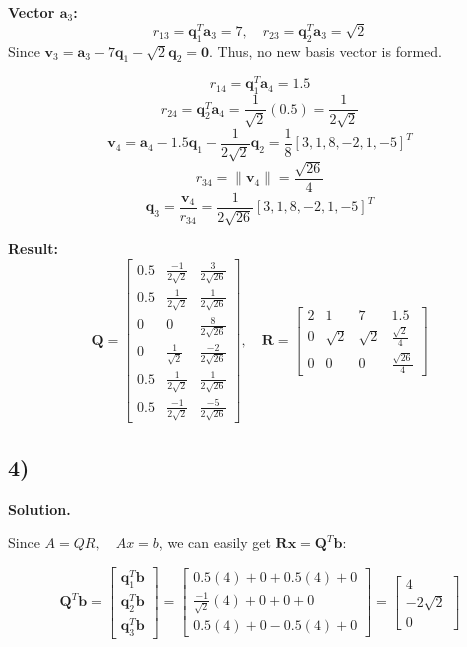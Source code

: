 \documentclass{article}
\newcommand{\0}{{\mathbf{0}}} %
\begin{document}
\textbf{Vector $\mathbf{a}_3$:}
\[ r_{13} = \mathbf{q}_1^T \mathbf{a}_3 = 7, \quad r_{23} = \mathbf{q}_2^T \mathbf{a}_3 = \sqrt{2} \]
Since $\mathbf{v}_3 = \mathbf{a}_3 - 7\mathbf{q}_1 - \sqrt{2}\mathbf{q}_2 = \mathbf{0}$. Thus, no new basis vector is formed.

\[ r_{14} = \mathbf{q}_1^T \mathbf{a}_4 = 1.5 \]
\[ r_{24} = \mathbf{q}_2^T \mathbf{a}_4 = \frac{1}{\sqrt{2}}(0.5) = \frac{1}{2\sqrt{2}} \]
\[ \mathbf{v}_4 = \mathbf{a}_4 - 1.5\mathbf{q}_1 - \frac{1}{2\sqrt{2}}\mathbf{q}_2 = \frac{1}{8}[3, 1, 8, -2, 1, -5]^T \]
\[ r_{34} = \|\mathbf{v}_4\| = \frac{\sqrt{26}}{4} \]
\[ \mathbf{q}_3 = \frac{\mathbf{v}_4}{r_{34}} = \frac{1}{2\sqrt{26}}[3, 1, 8, -2, 1, -5]^T \]

\textbf{Result:}
\[
\mathbf{Q} =
\begin{bmatrix} 0.5 & \frac{-1}{2\sqrt{2}} & \frac{3}{2\sqrt{26}} \\ 0.5 & \frac{1}{2\sqrt{2}} & \frac{1}{2\sqrt{26}} \\ 0 & 0 & \frac{8}{2\sqrt{26}} \\ 0 & \frac{1}{\sqrt{2}} & \frac{-2}{2\sqrt{26}} \\ 0.5 & \frac{1}{2\sqrt{2}} & \frac{1}{2\sqrt{26}} \\ 0.5 & \frac{-1}{2\sqrt{2}} & \frac{-5}{2\sqrt{26}}
\end{bmatrix}, \quad
\mathbf{R} =
\begin{bmatrix} 2 & 1 & 7 & 1.5 \\ 0 & \sqrt{2} & \sqrt{2} & \frac{\sqrt{2}}{4} \\ 0 & 0 & 0 & \frac{\sqrt{26}}{4}
\end{bmatrix}
\]

\subsection*{4)}
\textbf{Solution.}

Since $A = QR, \quad Ax = b$,
we can easily get $\mathbf{R}\mathbf{x} = \mathbf{Q}^T\mathbf{b}$:

\[
\mathbf{Q}^T\mathbf{b} =
\begin{bmatrix} \mathbf{q}_1^T\mathbf{b} \\ \mathbf{q}_2^T\mathbf{b} \\ \mathbf{q}_3^T\mathbf{b}
\end{bmatrix} =
\begin{bmatrix} 0.5(4)+0+0.5(4)+0 \\ \frac{-1}{\sqrt{2}}(4)+0+0+0 \\ 0.5(4)+0-0.5(4)+0
\end{bmatrix} =
\begin{bmatrix} 4 \\ -2\sqrt{2} \\ 0
\end{bmatrix}
\]
\end{document}
